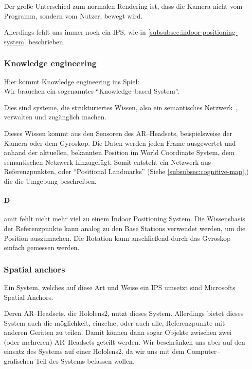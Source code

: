         Der große Unterschied zum normalen Rendering ist, dass die Kamera nicht vom Programm, sondern vom Nutzer, bewegt wird.

        Allerdings fehlt uns immer noch ein IPS, wie in \autoref{subsubsec:indoor-positioning-system} beschrieben.

    \subsubsection{Knowledge engineering}\label{subsubsec:knowledge-engineering}
        Hier kommt Knowledge engineering ins Spiel:\\
        Wir brauchen ein sogenanntes \enquote{Knowledge--based System}.~\autocite{wikipedia-contributors-2023C}

        Dies sind systeme, die strukturiertes Wissen, also ein semantisches Netzwerk~\autocite{wikipedia-contributors-2023K}, verwalten und zugänglich machen.

        Dieses Wissen kommt aus den Sensoren des AR--Headsets, beispielsweise der Kamera oder dem Gyroskop.
        Die Daten werden jeden Frame ausgewertet und anhand der aktuellen, bekannten Position im World Coordinate System, dem semantischen Netzwerk hinzugefügt.
        Somit entsteht ein Netzwerk aus Referenzpunkten, oder \enquote{Positional Landmarks} (Siehe \autoref{subsubsec:cognitive-map},) die die Umgebung beschreiben.

        \paragraph{D}amit fehlt nicht mehr viel zu einem Indoor Positioning System.
            Die Wissensbasis der Referenzpunkte kann analog zu den Base Stations verwendet werden, um die Position auszumachen.
            Die Rotation kann anschließend durch das Gyroskop einfach gemessen werden.

    \subsubsection{Spatial anchors}\label{subsubsec:spatial-anchors}
        Ein System, welches auf diese Art und Weise ein IPS umsetzt sind Microsofts Spatial Anchors.~\autocite{thetuvix-2023B}

        Deren AR--Headsets, die Hololens2, nutzt dieses System.
        Allerdings bietet dieses System auch die möglichkeit, einzelne, oder auch alle, Referenzpunkte mit anderen Geräten zu teilen.
        Damit können dann sogar Objekte zwischen zwei (oder mehreren) AR--Headsets geteilt werden.
        Wir beschränken uns aber auf den einsatz des Systems auf einer Hololens2, da wir uns mit dem Computer--grafischen Teil des Systems befassen wollen.


